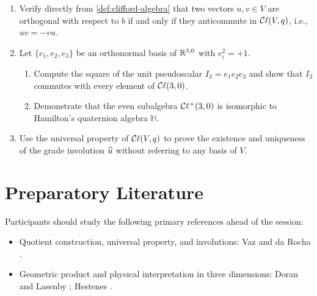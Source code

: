 \documentclass[11pt,a4paper]{article}
\begin{document}
\begin{enumerate}
  \item Verify directly from \cref{def:clifford-algebra} that two vectors
    $u, v \in V$ are orthogonal with respect to $b$ if and only if they
    anticommute in $\mathcal{C}\ell(V, q)$, i.e., $uv = -vu$.
  \item Let $\{e_1, e_2, e_3\}$ be an orthonormal basis of $\mathbb{R}^{3,0}$ with
    $e_i^2 = +1$.
    \begin{enumerate}
      \item Compute the square of the unit pseudoscalar $I_3 = e_1 e_2 e_3$
        and show that $I_3$ commutes with every element of $\mathcal{C}\ell(3,0)$.
      \item Demonstrate that the even subalgebra $\mathcal{C}\ell^+(3,0)$ is isomorphic
        to Hamilton's quaternion algebra $\mathbb{H}$.
    \end{enumerate}
  \item Use the universal property of $\mathcal{C}\ell(V, q)$ to prove the existence and
    uniqueness of the grade involution $\widehat{u}$ without referring to any
    basis of $V$.
\end{enumerate}

\section{Preparatory Literature}
\label{sec:literature}

Participants should study the following primary references ahead of the
session:
\begin{itemize}
  \item Quotient construction, universal property, and involutions:
    Vaz and da Rocha \cite[Chap.~2]{vazIntroductionCliffordAlgebras2016}.
  \item Geometric product and physical interpretation in three dimensions:
    Doran and Lasenby \cite[Chaps.~1--2]{doranGeometricAlgebraPhysicists2013};
    Hestenes \cite{hestenesNewFoundationsClassical2002}.
\end{itemize}

\printbibliography[title={References}]
\end{document}
